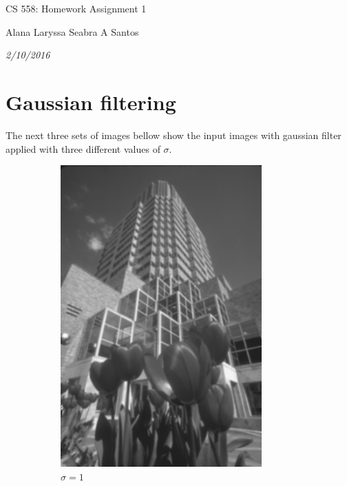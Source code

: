 \documentclass{article}
\begin{document}
\centerline{\sc \large CS 558: Homework Assignment 1}

\centerline{Alana Laryssa Seabra A Santos}
\centerline{\it 2/10/2016}


\section{Gaussian filtering}

The next three sets of images bellow show the input images with gaussian filter applied with three different values of $\sigma$.

\begin{figure}[!h]
  \begin{subfigure}[b]{0.3\textwidth}
  \centering
    \includegraphics[width=0.85\textwidth]{redsig1}
    \caption{$\sigma = 1$}
    \label{fig:f1}
  \end{subfigure}
  \hfill
  \begin{subfigure}[b]{0.3\textwidth}
    \centering

\end{subfigure}
\end{figure}
\end{document}
